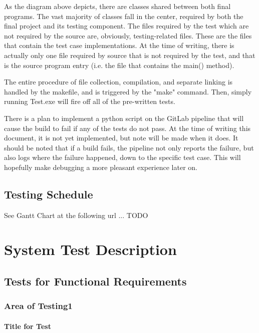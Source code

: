 \documentclass[12pt, titlepage]{article}
\begin{document}
	\bigskip
	\bigskip

	As the diagram above depicts, there are classes shared between both final programs. The vast majority of classes fall in the center, required by both the final project and its testing component. The files required by the test which are not required by the source are, obviously, testing-related files. These are the files that contain the test case implementations. At the time of writing, there is actually only one file required by source that is not required by the test, and that is the source program entry (i.e. the file that contains the main() method).

	\bigskip

	The entire procedure of file collection, compilation, and separate linking is handled by the makefile, and is triggered by the "make" command. Then, simply running Test.exe will fire off all of the pre-written tests.

	\bigskip

	There is a plan to implement a python script on the GitLab pipeline that will cause the build to fail if any of the tests do not pass. At the time of writing this document, it is not yet implemented, but note will be made when it does. It should be noted that if a build fails, the pipeline not only reports the failure, but also logs where the failure happened, down to the specific test case. This will hopefully make debugging a more pleasant experience later on.

	\subsection{Testing Schedule}
		
	See Gantt Chart at the following url ... TODO

\newpage
\section{System Test Description}
	
	\subsection{Tests for Functional Requirements}

		\subsubsection{Area of Testing1}
				
		\paragraph{Title for Test}
\end{document}
